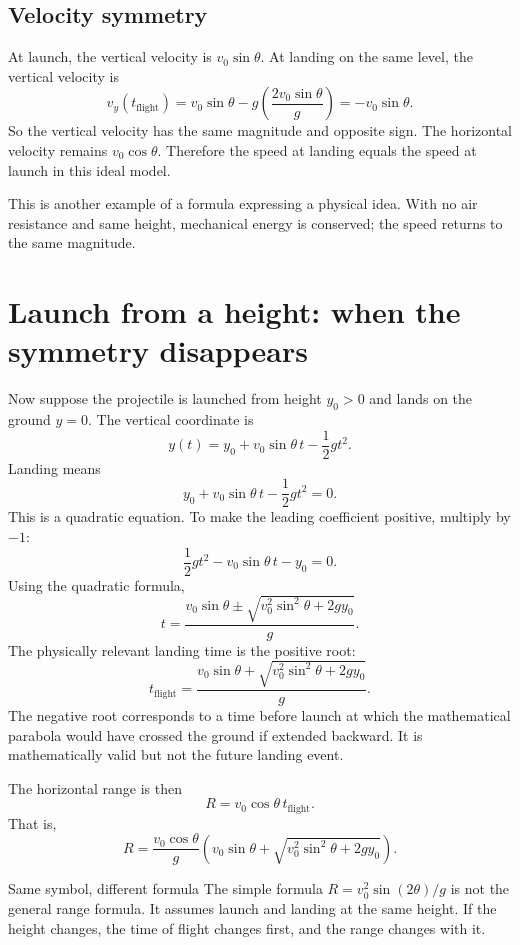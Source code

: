 \documentclass[11pt,a4paper]{article}
\begin{document}
\subsection{Velocity symmetry}

At launch, the vertical velocity is $v_0\sin\theta$. At landing on the same level, the vertical velocity is
\[
v_y(t_{\mathrm{flight}})=v_0\sin\theta-g\left(\frac{2v_0\sin\theta}{g}\right)=-v_0\sin\theta.
\]
So the vertical velocity has the same magnitude and opposite sign. The horizontal velocity remains $v_0\cos\theta$. Therefore the speed at landing equals the speed at launch in this ideal model.

This is another example of a formula expressing a physical idea. With no air resistance and same height, mechanical energy is conserved; the speed returns to the same magnitude.

\section{Launch from a height: when the symmetry disappears}

Now suppose the projectile is launched from height $y_0>0$ and lands on the ground $y=0$. The vertical coordinate is
\[
y(t)=y_0+v_0\sin\theta\,t-\frac12gt^2.
\]
Landing means
\[
y_0+v_0\sin\theta\,t-\frac12gt^2=0.
\]
This is a quadratic equation. To make the leading coefficient positive, multiply by $-1$:
\[
\frac12gt^2-v_0\sin\theta\,t-y_0=0.
\]
Using the quadratic formula,
\[
t=\frac{v_0\sin\theta\pm\sqrt{v_0^2\sin^2\theta+2gy_0}}{g}.
\]
The physically relevant landing time is the positive root:
\[
\boxed{t_{\mathrm{flight}}=\frac{v_0\sin\theta+\sqrt{v_0^2\sin^2\theta+2gy_0}}{g}.}
\]
The negative root corresponds to a time before launch at which the mathematical parabola would have crossed the ground if extended backward. It is mathematically valid but not the future landing event.

The horizontal range is then
\[
\boxed{R=v_0\cos\theta\,t_{\mathrm{flight}}.}
\]
That is,
\[
R=\frac{v_0\cos\theta}{g}\left(v_0\sin\theta+\sqrt{v_0^2\sin^2\theta+2gy_0}\right).
\]

\begin{warningbox}{Same symbol, different formula}
The simple formula $R=v_0^2\sin(2\theta)/g$ is not the general range formula. It assumes launch and landing at the same height. If the height changes, the time of flight changes first, and the range changes with it.
\end{warningbox}
\end{document}
